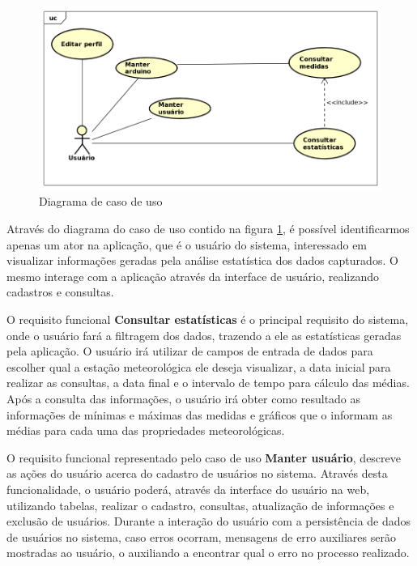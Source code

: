 \begin{figure}[H]
    \centering
    \caption{Diagrama de caso de uso} \label{fig:figure_diagrama_caso_uso}
    \includegraphics[scale=0.6]{diagrams/caso_de_uso.png}
    \hfill
{}
\end{figure}

Através do diagrama do caso de uso contido na figura \ref{fig:figure_diagrama_caso_uso}, é possível identificarmos apenas um ator na aplicação, que é o usuário do sistema, interessado em visualizar informações geradas pela análise estatística dos dados capturados. O mesmo interage com a aplicação através da interface de usuário, realizando cadastros e consultas.

O requisito funcional \textbf{Consultar estatísticas} é o principal requisito do sistema, onde o usuário fará a filtragem dos dados, trazendo a ele as estatísticas geradas pela aplicação.
O usuário irá utilizar de campos de entrada de dados para escolher qual a estação meteorológica ele deseja visualizar, a data inicial para realizar as consultas, a data final e o intervalo de tempo para cálculo das médias.
Após a consulta das informações, o usuário irá obter como resultado as informações de mínimas e máximas das medidas e gráficos que o informam as médias para cada uma das propriedades meteorológicas.

O requisito funcional representado pelo caso de uso \textbf{Manter usuário}, descreve as ações do usuário acerca do cadastro de usuários no sistema.
Através desta funcionalidade, o usuário poderá, através da interface do usuário na web, utilizando tabelas, realizar o cadastro, consultas, atualização de informações e exclusão de usuários.
Durante a interação do usuário com a persistência de dados de usuários no sistema, caso erros ocorram, mensagens de erro auxiliares serão mostradas ao usuário, o auxiliando a encontrar qual o erro no processo realizado.

